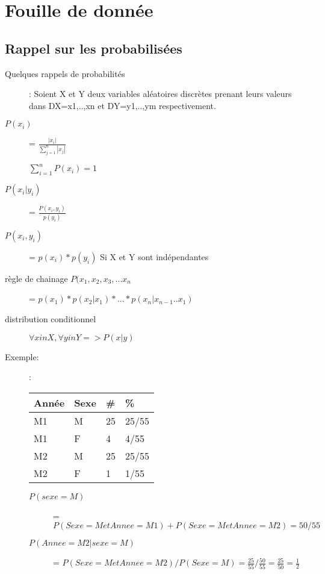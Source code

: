 \part{Fouille de donnée}
\pagebreak

\chapter{Rappel sur les probabilisées}

\begin{description}
\item[Quelques rappels de probabilités]: Soient X et Y deux variables aléatoires discrètes prenant leurs valeurs dans DX={x1,..,xn} et DY={y1,..,ym} respectivement.  
\item[$P(x_i)$] = $\frac{|x_i|}{\sum_{j=1}^n |x_j|}$
\item[] $\sum_{i=1}^n P(x_i) = 1$
\item[$P(x_i | y_i)$] = $\frac{P(x_i,y_i)}{p(y_i)}$
\item[$P(x_i,y_i)$] = $p(x_i) * p(y_i)$ Si X et Y sont indépendantes
\item[règle de chainage $P(x_1,x_2,x_3,...x_n$] = $p(x_1)*p(x_2|x_1)*...*p(x_n|x_{n-1}..x_1)$
\item[distribution conditionnel] $ \forall x in X, \forall y in Y => P(x|y)$
\end{description}

Exemple:
\begin{description}
\item[]: 
\begin{tabular}{ll|ll}
  \hline
  Année & Sexe & \# & \%  \\
  \hline
   M1 & M  & 25  &  25/55   \\
   M1 & F  & 4 &  4/55  \\
   M2 & M  & 25  & 25/55   \\
   M2 & F  & 1  &  1/55  \\
  \hline
\end{tabular}
\item[]
\begin{description}
\item[$P(sexe=M)$] = $P(Sexe=M et Annee=M1) + P(Sexe=M et Annee=M2) = 50/55$
\item[$P(Annee=M2 | sexe=M)$] = $P(Sexe=M et Annee=M2) / P(Sexe=M) = \frac{25}{55} / \frac{50}{55} = \frac{25}{50} = \frac{1}{2}$
\end{description}
\end{description}

